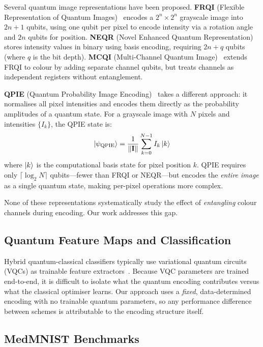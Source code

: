 \documentclass[conference,compsoc]{IEEEtran}
\begin{document}
Several quantum image representations have been proposed.
\textbf{FRQI} (Flexible Representation of Quantum Images)~\cite{le2011flexible} encodes a $2^n \times 2^n$ grayscale image into $2n + 1$ qubits, using one qubit per pixel to encode intensity via a rotation angle and $2n$ qubits for position.
\textbf{NEQR} (Novel Enhanced Quantum Representation)~\cite{zhang2013neqr} stores intensity values in binary using basis encoding, requiring $2n + q$ qubits (where $q$ is the bit depth).
\textbf{MCQI} (Multi-Channel Quantum Image)~\cite{sun2011multi} extends FRQI to colour by adding separate channel qubits, but treats channels as independent registers without entanglement.

\textbf{QPIE} (Quantum Probability Image Encoding)~\cite{yao2017quantum} takes a different approach: it normalises all pixel intensities and encodes them directly as the probability amplitudes of a quantum state.
For a grayscale image with $N$ pixels and intensities $\{I_k\}$, the QPIE state is:
\begin{equation}
    \ket{\psi_\text{QPIE}} = \frac{1}{\|\mathbf{I}\|} \sum_{k=0}^{N-1} I_k \ket{k}
    \label{eq:qpie_original}
\end{equation}
where $\ket{k}$ is the computational basis state for pixel position $k$.
QPIE requires only $\lceil\log_2 N\rceil$ qubits---fewer than FRQI or NEQR---but encodes the \emph{entire image} as a single quantum state, making per-pixel operations more complex.

None of these representations systematically study the effect of \emph{entangling} colour channels during encoding.
Our work addresses this gap.

\subsection{Quantum Feature Maps and Classification}

Hybrid quantum-classical classifiers typically use variational quantum circuits (VQCs) as trainable feature extractors~\cite{cong2019quantum, henderson2020quanvolutional, hur2022quantum, benedetti2019parameterized}.
Because VQC parameters are trained end-to-end, it is difficult to isolate what the quantum encoding contributes versus what the classical optimiser learns.
Our approach uses a \emph{fixed}, data-determined encoding with no trainable quantum parameters, so any performance difference between schemes is attributable to the encoding structure itself.

\subsection{MedMNIST Benchmarks}
\end{document}
